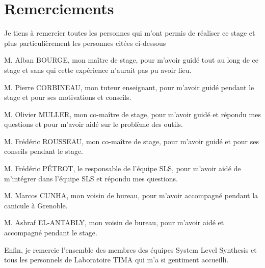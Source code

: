 \chapter*{Remerciements}
\justify
\setlength{\parindent}{0pt}
Je tiens à remercier toutes les personnes qui m'ont permis de réaliser ce stage et plus particulièrement les personnes citées ci-dessous

M. Alban BOURGE, mon maître de stage, pour m'avoir guidé tout au long de ce stage et sans qui cette expérience n'aurait pas pu avoir lieu.

M. Pierre CORBINEAU, mon tuteur enseignant, pour m'avoir guidé pendant le stage et pour ses motivations et conseils.

M. Olivier MULLER, mon co-maître de stage, pour m'avoir guidé et répondu mes questions et pour m'avoir aidé sur le problème des outils.

M. Frédéric ROUSSEAU, mon co-maître de stage, pour m'avoir guidé et pour ses conseils pendant le stage.

M. Frédéric PÉTROT, le responsable de l'équipe SLS, pour m'avoir aidé de m'intégrer dans l'équipe SLS et répondu mes questions.

M. Marcos CUNHA, mon voisin de bureau, pour m'avoir accompagné pendant la canicule à Grenoble.

M. Ashraf EL-ANTABLY, mon voisin de bureau, pour m'avoir aidé et accompagné pendant le stage.

Enfin, je remercie l'ensemble des membres des équipes System Level Synthesis et tous les personnels de Laboratoire TIMA qui m'a si gentiment accueilli.